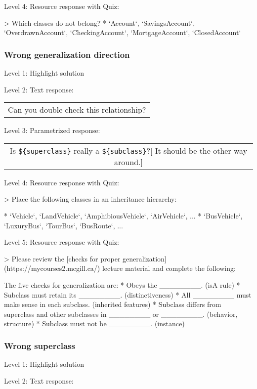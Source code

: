 \noindent Level 4: Resource response with Quiz:

> Which classes do not belong?
* `Account`, `SavingsAccount`, `OverdrawnAccount`, `CheckingAccount`, `MortgageAccount`,
`ClosedAccount`


\subsubsection{Wrong generalization direction}

\noindent Level 1: Highlight solution \medskip

\noindent Level 2: Text response: \medskip

\begin{tabular}{|c}
Can you double check this relationship?
\end{tabular} \medskip

\noindent Level 3: Parametrized response: \medskip

\begin{tabular}{|c}
Is \verb|${superclass}| really a \verb|${subclass}|?[ It should be the other way around.]
\end{tabular} \medskip

\noindent Level 4: Resource response with Quiz:

> Place the following classes in an inheritance hierarchy:

* `Vehicle`, `LandVehicle`, `AmphibiousVehicle`, `AirVehicle`, ...
* `BusVehicle`, `LuxuryBus`, `TourBus`, `BusRoute`, ...

\noindent Level 5: Resource response with Quiz:

> Please review the [checks for proper generalization](https://mycourses2.mcgill.ca/) lecture material
and complete the following:

The five checks for generalization are:
* Obeys the ________. (isA rule)
* Subclass must retain its ________. (distinctiveness)
* All ________ must make sense in each subclass. (inherited features)
* Subclass differs from superclass and other subclasses in ________ or ________. 
(behavior, structure)
* Subclass must not be ________. (instance)


\subsubsection{Wrong superclass}

\noindent Level 1: Highlight solution \medskip

\noindent Level 2: Text response: \medskip

